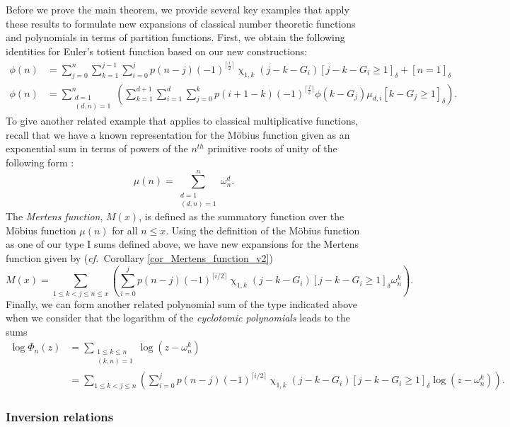 \documentclass[12pt,reqno,a4letter]{article}
\numberwithin{figure}{section}
\numberwithin{table}{section}
\numberwithin{equation}{section}
\let\citep\cite
\newcommand{\cf}{\textit{cf.~}}
\newcommand{\Iverson}[1]{\ensuremath{\left[#1\right]_{\delta}}}
\renewcommand{\chi}{\upchi}
\theoremstyle{plain}
\numberwithin{theorem}{section}
\theoremstyle{definition}
\begin{document}
Before we prove the main theorem, we provide several key examples that apply these results to 
formulate new expansions of classical number theoretic functions and polynomials 
in terms of partition functions. 
First, we obtain the following identities for 
Euler's totient function based on our new constructions: 
\begin{align*} 
\phi(n) & = \sum_{j=0}^n \sum_{k=1}^{j-1} \sum_{i=0}^{j} 
     p(n-j) (-1)^{\lceil \frac{i}{2} \rceil} \chi_{1,k}(j-k-G_i) \Iverson{j-k-G_i \geq 1} + 
     \Iverson{n=1} \\ 
\phi(n) & = \sum_{\substack{d=1 \\ (d,n)=1}}^n 
     \left(\sum_{k=1}^{d+1} \sum_{i=1}^d \sum_{j=0}^k 
     p(i+1-k) (-1)^{\lceil \frac{j}{2} \rceil} \phi(k-G_j) \mu_{d,i} \Iverson{k-G_j \geq 1}\right). 
\end{align*} 
To give another related example that applies to classical multiplicative functions, 
recall that we have a known representation for the M\"obius function given as an 
exponential sum in terms of powers of the 
$n^{th}$ primitive roots of unity of the following form \citep[\S 16.6]{HARDYWRIGHT}: 
\[ 
\mu(n) = \sum_{\substack{d=1 \\ (d,n)=1}}^n \omega_n^d. 
\] 
The \emph{Mertens function}, $M(x)$, is defined as the summatory function over the 
M\"obius function $\mu(n)$ for all $n \leq x$. Using the definition of the M\"obius function as one of our 
type I sums defined above, we have new expansions for the Mertens function given by 
(\cf Corollary \ref{cor_Mertens_function_v2}) 
\[
M(x) = \sum_{1 \leq k < j \leq n \leq x} \left(\sum_{i=0}^j p(n-j) (-1)^{\lceil i/2 \rceil} 
     \chi_{1,k}(j-k-G_i) \Iverson{j-k-G_i \geq 1} \omega_n^k\right). 
\] 
Finally, we can form another related polynomial sum of the type indicated above 
when we consider that the logarithm of the \emph{cyclotomic polynomials} leads to the sums 
\begin{align*} 
\log \Phi_n(z) & = \sum_{\substack{1 \leq k \leq n \\ (k, n) = 1}} 
     \log\left(z-\omega_n^k\right) \\ 
     & = 
     \sum_{1 \leq k < j \leq n} \left(\sum_{i=0}^j p(n-j) (-1)^{\lceil i/2 \rceil} 
     \chi_{1,k}(j-k-G_i) \Iverson{j-k-G_i \geq 1} 
     \log\left(z-\omega_n^k\right)
     \right). 
\end{align*} 

\subsubsection{Inversion relations} 
\end{document}

